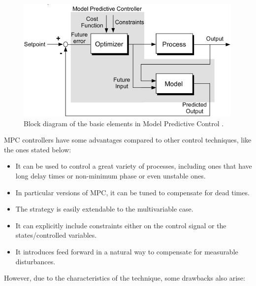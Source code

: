 \begin{figure}[h!]
\centering
\includegraphics[scale=0.8]{Images/Chapter2/mpc_block_diagram.jpg}
\caption{Block diagram of the basic elements in Model Predictive Control \cite{Al-Sanad2005}.}
\label{fig:mpc_diagram}
\end{figure}

MPC controllers have some advantages compared to other control techniques, like the ones stated below:

\begin{itemize}

\item It can be used to control a great variety of processes, including ones that have long delay times or non-minimum phase or even unstable ones. 

\item In particular versions of MPC, it can be tuned to compensate for dead times.

\item The strategy is easily extendable to the multivariable case.

\item It can explicitly include constraints either on the control signal or the states/controlled variables.

\item It introduces feed forward in a natural way to compensate for measurable disturbances.

\end{itemize}

However, due to the characteristics of the technique, some drawbacks also arise:


